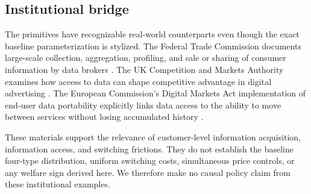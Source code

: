 \subsection{Institutional bridge}

The primitives have recognizable real-world counterparts even though the exact baseline parameterization is stylized.  The Federal Trade Commission documents large-scale collection, aggregation, profiling, and sale or sharing of consumer information by data brokers \citep{FTC2014DataBrokers}.  The UK Competition and Markets Authority examines how access to data can shape competitive advantage in digital advertising \citep{CMA2020Data}.  The European Commission's Digital Markets Act implementation of end-user data portability explicitly links data access to the ability to move between services without losing accumulated history \citep{EUDataPortability}.

These materials support the relevance of customer-level information acquisition, information access, and switching frictions.  They do not establish the baseline four-type distribution, uniform switching costs, simultaneous price controls, or any welfare sign derived here.  We therefore make no causal policy claim from these institutional examples.
